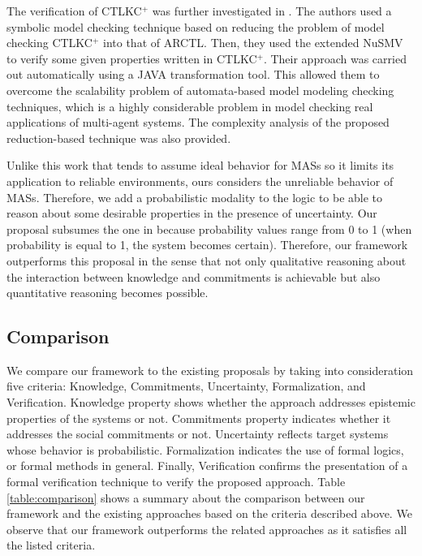The verification of CTLKC$^+$ was further investigated in \cite{Al-Saqqar2014b}. The authors used a symbolic model checking technique based on reducing the problem of model checking CTLKC$^+$ into that of ARCTL. Then, they used the extended NuSMV to verify some given properties written in CTLKC$^+$. Their approach was carried out automatically using a JAVA transformation tool. This allowed them to overcome the scalability problem of automata-based model modeling checking techniques, which is a highly considerable problem in model checking real applications of multi-agent systems. The complexity analysis of the proposed reduction-based technique was also provided.

Unlike this work that tends to assume ideal behavior for MASs so it limits its application to reliable environments, ours considers the unreliable behavior of MASs. Therefore, we add a probabilistic modality to the logic to be able to reason about some desirable properties in the presence of uncertainty. Our proposal subsumes the one in \cite{Al-Saqqar2014a} because probability values range from 0 to 1 (when probability is equal to 1, the system becomes certain). Therefore, our framework outperforms this proposal in the sense that not only qualitative reasoning about the interaction between knowledge and commitments is achievable but also quantitative reasoning becomes possible.



\subsection{Comparison}

We compare our framework to the existing proposals by taking into
consideration five criteria: Knowledge, Commitments, Uncertainty,
Formalization, and Verification. Knowledge property shows whether
the approach addresses epistemic properties of the systems or not.
Commitments property indicates whether it addresses the social
commitments or not. Uncertainty reflects target systems whose
behavior is probabilistic. Formalization indicates the use of
formal logics, or formal methods in general. Finally, Verification
confirms the presentation of a formal verification technique to
verify the proposed approach. Table \ref{table:comparison} shows a
summary about the comparison between our framework and the
existing approaches based on the criteria described above.
We observe that our framework outperforms the related approaches as
it satisfies all the listed criteria.

